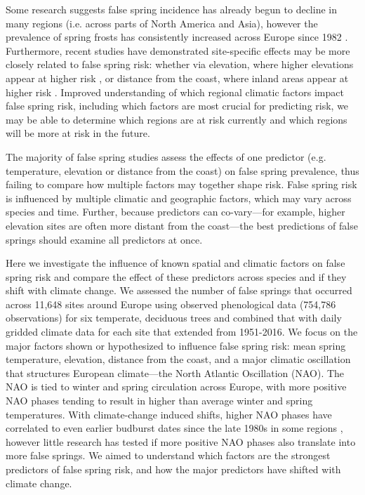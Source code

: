 \documentclass{article}\usepackage[]{graphicx}\usepackage[]{color}
\begin{document}
Some research suggests false spring incidence has already begun to decline in many regions (i.e. across parts of North America and Asia), however the prevalence of spring frosts has consistently increased across Europe since 1982 \citep{Liu2018}. Furthermore, recent studies have demonstrated site-specific effects may be more closely related to false spring risk: whether via elevation, where higher elevations appear at higher risk \citep{Ma2018, Vitasse2018, Vitra2017}, or distance from the coast, where inland areas appear at higher risk \citep{ Ma2018, Wypych2016a}. Improved understanding of which regional climatic factors impact false spring risk, including which factors are most crucial for predicting risk, we may be able to determine which regions are at risk currently and which regions will be more at risk in the future.

The majority of false spring studies assess the effects of one predictor (e.g. temperature, elevation or distance from the coast) on false spring prevalence, thus failing to compare how multiple factors may together shape risk. False spring risk is influenced by multiple climatic and geographic factors, which may vary across species and time. Further, because predictors can co-vary---for example, higher elevation sites are often more distant from the coast---the best predictions of false springs should examine all predictors at once. 

Here we investigate the influence of known spatial and climatic factors on false spring risk \citep[defined here as when fell temperatures below -2.2$^{\circ}$ between estimated budburst and leafout][]{Schwartz1993} and compare the effect of these predictors across species and if they shift with climate change. We assessed the number of false springs that occurred across 11,648 sites around Europe using observed phenological data (754,786 observations) for six temperate, deciduous trees and combined that with daily gridded climate data for each site that extended from 1951-2016. We focus on the major factors shown or hypothesized to influence false spring risk: mean spring temperature, elevation, distance from the coast, and a major climatic oscillation that structures European climate---the North Atlantic Oscillation (NAO). The NAO  is tied to winter and spring circulation across Europe, with more positive NAO phases tending to result in higher than average winter and spring temperatures. With climate-change induced shifts, higher NAO phases have correlated to even earlier budburst dates since the late 1980s in some regions \citep{Chmielewski2001}, however little research has tested if more positive NAO phases also translate into more false springs. We aimed to understand which factors are the strongest predictors of false spring risk, and how the major predictors have shifted with climate change. 
\end{document}
